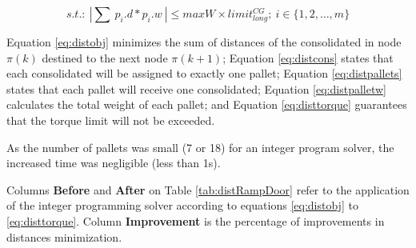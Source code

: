 \documentclass[preprint,authoryear]{elsarticle}
\begin{document}
\begin{equation} \label{eq:disttorque}
	s.t.:\ | \sum\ p_i.d * p_i.w\ | \leq maxW \times limit^{CG}_{long} ;\ i \in \{1,2,\ldots,m\}
\end{equation}

Equation \ref{eq:distobj} minimizes the sum of distances of the consolidated in node $\pi(k)$ destined to the next node $\pi(k+1)$; Equation \ref{eq:distcons} states that each consolidated will be assigned to exactly one pallet; Equation \ref{eq:distpallets} states that each pallet will receive one consolidated; Equation \ref{eq:distpalletw} calculates the total weight of each pallet; and Equation \ref{eq:disttorque} guarantees that the torque limit will not be exceeded. 

As the number of pallets was small (7 or 18) for an integer program solver, the increased time was negligible (less than 1s).

Columns {\bf Before} and {\bf After} on Table \ref{tab:distRampDoor} refer to the application of the integer programming solver according to equations \ref{eq:distobj} to \ref{eq:disttorque}. Column {\bf Improvement} is the percentage of improvements in distances minimization.


\vspace{2.0mm}
\end{document}
